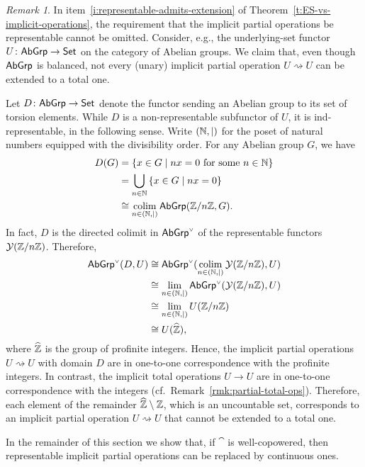\documentclass[a4paper,10pt,reqno]{amsart}
\theoremstyle{definition}
\theoremstyle{remark}
\newtheorem{remark}[theorem]{Remark}
\begin{document}
\begin{remark}\label{rm:profinite-integers}
	In item~\ref{i:representable-admits-extension} of Theorem~\ref{t:ES-vs-implicit-operations}, the requirement that the implicit partial operations be representable cannot be omitted. Consider, e.g., the underlying-set functor $U\colon {\sf AbGrp}\to {\sf Set}$ on the category of Abelian groups. We claim that, even though ${\sf AbGrp}$ is balanced, not every (unary) implicit partial operation $U\rightsquigarrow U$ can be extended to a total one.
	
	Let $D\colon {\sf AbGrp}\to {\sf Set}$ denote the functor sending an Abelian group to its set of torsion elements.
	While $D$ is a non-representable subfunctor of $U$, it is ind-representable, in the following sense. Write $(\mathbb{N},\mid)$ for the poset of natural numbers equipped with the divisibility order. For any Abelian group $G$, we have
	\begin{align*}
	D(G) &= \{x\in G\mid nx=0 \text{ for some } n\in \N\} \\
	&= \bigcup_{n\in \N}{\{x\in G\mid nx=0\}} \\
	&\cong \colim_{n\in (\N,\mid)} \AGrp(\Z/n\Z,G).
	\end{align*}
	In fact, $D$ is the directed colimit in ${{\sf AbGrp}}^{\text{\tiny$\vee$}}$ of the representable functors $\mathcal{Y}(\mathbb{Z}/n\mathbb{Z})$. Therefore,
	\begin{align*}
	\CP{\AGrp}(D,U) &\cong \CP{\AGrp}(\colim_{n\in (\N,\mid)}{\yo(\Z/n\Z)},U) \\
	&\cong \lim_{n\in (\N,\mid)}{\CP{\AGrp}(\yo(\Z/n\Z),U)} \\
	&\cong \lim_{n\in (\N,\mid)}{U(\Z/n\Z)} \\
	&\cong U(\widehat{\Z}),
	\end{align*}
	where $\widehat{\mathbb{Z}}$ is the group of profinite integers. Hence, the implicit partial operations $U\rightsquigarrow U$ with domain $D$ are in one-to-one correspondence with the profinite integers. In contrast, the implicit total operations $U\to U$ are in one-to-one correspondence with the integers (cf.\ Remark~\ref{rmk:partial-total-ops}). Therefore, each element of the remainder $\widehat{\mathbb{Z}}\setminus \mathbb{Z}$, which is an uncountable set, corresponds to an implicit partial operation $U\rightsquigarrow U$ that cannot be extended to a total one.
\end{remark}

In the remainder of this section we show that, if $\cat$ is well-copowered, then representable implicit partial operations can be replaced by continuous ones.
\end{document}
